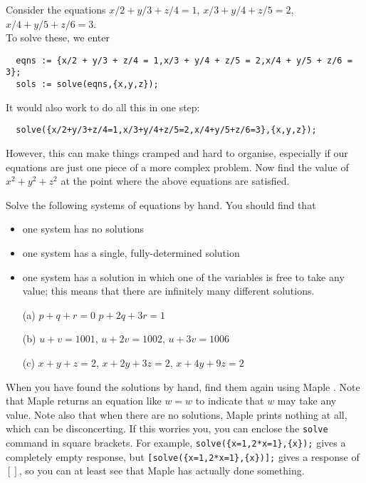 \documentclass[a4paper,10pt]{amsbook}
\numberwithin{example}{chapter}
\begin{document}
\begin{exercise}\label{ex-hilbert-lineq}
 Consider the equations
  $x/2 + y/3 + z/4 = 1$, \hspace{2em}
  $x/3 + y/4 + z/5 = 2$, \hspace{2em}
  $x/4 + y/5 + z/6 = 3$.\\
 To solve these, we enter
\begin{verbatim}
  eqns := {x/2 + y/3 + z/4 = 1,x/3 + y/4 + z/5 = 2,x/4 + y/5 + z/6 = 3};
  sols := solve(eqns,{x,y,z});
\end{verbatim}
 It would also work to do all this in one step:
\begin{verbatim}
  solve({x/2+y/3+z/4=1,x/3+y/4+z/5=2,x/4+y/5+z/6=3},{x,y,z});
\end{verbatim}
 However, this can make things cramped and hard to organise,
 especially if our equations are just one piece of a more complex
 problem.  Now find the value of $x^2+y^2+z^2$ at the point where the
 above equations are satisfied.
\end{exercise}

\begin{exercise}\label{ex-linear-trichotomy}
 Solve the following systems of equations by hand.  You should find
 that 
 \begin{itemize}
  \item one system has no solutions
  \item one system has a single, fully-determined solution
  \item one system has a solution in which one of the variables is
   free to take any value; this means that there are infinitely many
   different solutions. 
 \end{itemize}
 \begin{itemize}
  \item[(a)] $p +  q +  r = 0$ \hspace{3em}
             $p + 2q + 3r = 1$
  \item[(b)]
    $u + v  = 1001$,  \hspace{2em} 
    $u + 2v = 1002$,  \hspace{2em} 
    $u + 3v = 1006$
  \item[(c)] 
      $x +  y +  z = 2$,  \hspace{2em} 
      $x + 2y + 3z = 2$,  \hspace{2em} 
      $x + 4y + 9z = 2$
 \end{itemize}
 When you have found the solutions by hand, find them again
 using Maple \note{\NOTEsolve,\NOTEmultisolve}.  Note that
 Maple returns an equation like $w=w$ to indicate that $w$
 may take any value.  Note also that when there are no
 solutions, Maple prints nothing at all, which can be
 disconcerting.  If this worries you, you can enclose the
 \verb~solve~ command in square brackets.  For example,
 \verb~solve({x=1,2*x=1},{x});~ gives a completely empty
 response, but \verb~[solve({x=1,2*x=1},{x})];~ gives a
 response of $[]$, so you can at least see that Maple has
 actually done something.
\end{exercise}
\end{document}

